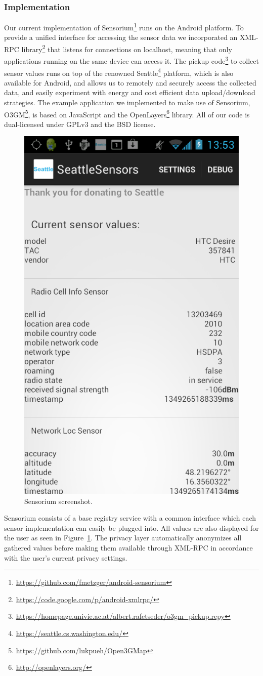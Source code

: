 \subsubsection{Implementation}

Our current implementation of Sensorium\footnote{\url{https://github.com/fmetzger/android-sensorium}} runs on the Android platform. To provide a unified interface for accessing the sensor data we incorporated an XML-RPC library\footnote{\url{https://code.google.com/p/android-xmlrpc/}} that listens for connections on localhost, meaning that only applications running on the same device can access it. The pickup code\footnote{\url{https://homepage.univie.ac.at/albert.rafetseder/o3gm_pickup.repy}} to collect sensor values runs on top of the renowned Seattle\footnote{\url{https://seattle.cs.washington.edu/}} platform, which is also available for Android, and allows us to remotely and securely access the collected data, and easily experiment with energy and cost efficient data upload/download strategies. The example application we implemented to make use of Sensorium, O3GM\footnote{\url{https://github.com/lukpueh/Open3GMap}}, is based on JavaScript and the OpenLayers\footnote{\url{http://openlayers.org/}} library. All of our code is dual-licensed under GPLv3 and the BSD license.

\begin{figure}[t!]
\centering
\includegraphics[width=0.45\columnwidth]{images/sesescreenshot.png}
\caption{\small Sensorium screenshot.}
\label{c5:fig:screenshot}
\end{figure}

Sensorium consists of a base registry service with a common interface which each sensor implementation can easily be plugged into. All values are also displayed for the user as seen in Figure~\ref{c5:fig:screenshot}. The privacy layer automatically anonymizes all gathered values before making them available through XML-RPC in accordance with the user's current privacy settings.

